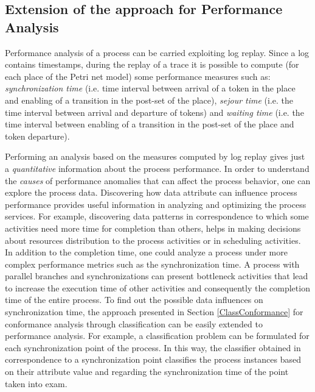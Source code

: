 \documentclass{llncs}
\begin{document}
\subsection{Extension of the approach for Performance Analysis}\label{ClassPerf}
Performance analysis of a process can be carried exploiting log replay. Since a log contains timestamps, during the replay of a trace it is possible to compute (for each place of the Petri net model) some performance measures such as: \emph{synchronization time} (i.e. time interval between arrival of a token in the place and enabling of a transition in the post-set of the place), \emph{sejour time} (i.e. the time interval between arrival and departure of tokens) and \emph{waiting time} (i.e. the time interval between enabling of a transition in the post-set of the place and token departure).

Performing an analysis based on the measures computed by log replay gives just a \emph{quantitative} information about the process performance. In order to understand the \emph{causes} of performance anomalies that can affect the process behavior, one can explore the process data. Discovering how data attribute can influence process performance provides useful information in analyzing and optimizing the process services. For example, discovering data patterns in correspondence to which some activities need more time for completion than others, helps in making decisions about resources distribution to the process activities or in scheduling activities. In addition to the completion time, one could analyze a process under more complex performance metrics such as the synchronization time. A process with parallel branches and synchronizations can present bottleneck activities that lead to increase the execution time of other activities and consequently the completion time of the entire process. To find out the possible data influences on synchronization time, the approach presented in Section \ref{ClassConformance} for conformance analysis through classification can be easily extended to performance analysis. For example, a classification problem can be formulated for each synchronization point of the process. In this way, the classifier obtained in correspondence to a synchronization point classifies the process instances based on their attribute value and regarding the synchronization time of the point taken into exam. 
\end{document}
